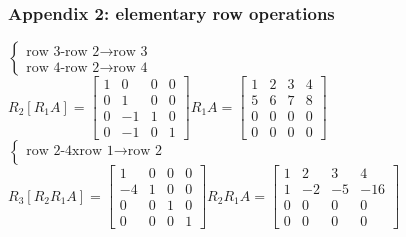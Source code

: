 \begin{frame}
	\frametitle{Appendix 2: elementary row operations}
	$\begin{cases}
	\text{row 3-row 2} \rightarrow \text{row 3}\\
	\text{row 4-row 2} \rightarrow \text{row 4}
	\end{cases}$\\ $R_2[R_1A]=\begin{bmatrix}
	1 & 0 & 0& 0\\
	0 & 1 & 0 & 0\\
	0 & -1 & 1 & 0\\
	0 & -1 & 0 & 1
	\end{bmatrix}R_1A=\begin{bmatrix}
	1 & 2 & 3 & 4\\
	5 & 6 & 7 & 8\\
	0 & 0 & 0 & 0\\
	0 & 0 & 0 & 0
	\end{bmatrix}$\\
	$\begin{cases}
	\text{row 2-4xrow 1} \rightarrow \text{row 2}\\
	\end{cases}$\\ $R_3[R_2R_1A]=\begin{bmatrix}
	1 & 0 & 0& 0\\
	-4 & 1 & 0 & 0\\
	0 & 0 & 1 & 0\\
	0 & 0 & 0 & 1
	\end{bmatrix}R_2R_1A=\begin{bmatrix}
	1 & 2 & 3 & 4\\
	1 & -2 & -5 & -16\\
	0 & 0 & 0 & 0\\
	0 & 0 & 0 & 0
	\end{bmatrix}$
\end{frame}

